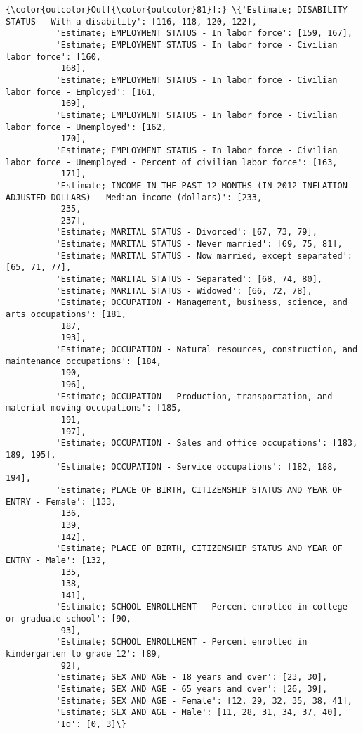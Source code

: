 \documentclass{article}
\begin{document}
            \begin{Verbatim}[commandchars=\\\{\}]
{\color{outcolor}Out[{\color{outcolor}81}]:} \{'Estimate; DISABILITY STATUS - With a disability': [116, 118, 120, 122],
          'Estimate; EMPLOYMENT STATUS - In labor force': [159, 167],
          'Estimate; EMPLOYMENT STATUS - In labor force - Civilian labor force': [160,
           168],
          'Estimate; EMPLOYMENT STATUS - In labor force - Civilian labor force - Employed': [161,
           169],
          'Estimate; EMPLOYMENT STATUS - In labor force - Civilian labor force - Unemployed': [162,
           170],
          'Estimate; EMPLOYMENT STATUS - In labor force - Civilian labor force - Unemployed - Percent of civilian labor force': [163,
           171],
          'Estimate; INCOME IN THE PAST 12 MONTHS (IN 2012 INFLATION-ADJUSTED DOLLARS) - Median income (dollars)': [233,
           235,
           237],
          'Estimate; MARITAL STATUS - Divorced': [67, 73, 79],
          'Estimate; MARITAL STATUS - Never married': [69, 75, 81],
          'Estimate; MARITAL STATUS - Now married, except separated': [65, 71, 77],
          'Estimate; MARITAL STATUS - Separated': [68, 74, 80],
          'Estimate; MARITAL STATUS - Widowed': [66, 72, 78],
          'Estimate; OCCUPATION - Management, business, science, and arts occupations': [181,
           187,
           193],
          'Estimate; OCCUPATION - Natural resources, construction, and maintenance occupations': [184,
           190,
           196],
          'Estimate; OCCUPATION - Production, transportation, and material moving occupations': [185,
           191,
           197],
          'Estimate; OCCUPATION - Sales and office occupations': [183, 189, 195],
          'Estimate; OCCUPATION - Service occupations': [182, 188, 194],
          'Estimate; PLACE OF BIRTH, CITIZENSHIP STATUS AND YEAR OF ENTRY - Female': [133,
           136,
           139,
           142],
          'Estimate; PLACE OF BIRTH, CITIZENSHIP STATUS AND YEAR OF ENTRY - Male': [132,
           135,
           138,
           141],
          'Estimate; SCHOOL ENROLLMENT - Percent enrolled in college or graduate school': [90,
           93],
          'Estimate; SCHOOL ENROLLMENT - Percent enrolled in kindergarten to grade 12': [89,
           92],
          'Estimate; SEX AND AGE - 18 years and over': [23, 30],
          'Estimate; SEX AND AGE - 65 years and over': [26, 39],
          'Estimate; SEX AND AGE - Female': [12, 29, 32, 35, 38, 41],
          'Estimate; SEX AND AGE - Male': [11, 28, 31, 34, 37, 40],
          'Id': [0, 3]\}
\end{Verbatim}
        
\end{document}
